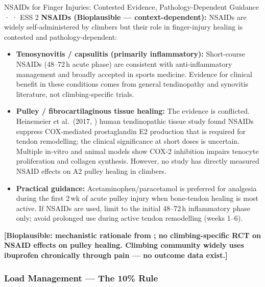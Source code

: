 \begin{bioplausbox}{NSAIDs for Finger Injuries: Contested Evidence, Pathology-Dependent Guidance · \bioplausible · ESS 2}
\textbf{NSAIDs (Bioplausible --- context-dependent):} NSAIDs are widely self-administered by climbers but their role in finger-injury healing is contested and pathology-dependent:
\begin{itemize}[leftmargin=1.5em,noitemsep]
  \item \textbf{Tenosynovitis / capsulitis (primarily inflammatory):} Short-course NSAIDs (48--72\,h acute phase) are consistent with anti-inflammatory management and broadly accepted in sports medicine. Evidence for clinical benefit in these conditions comes from general tendinopathy and synovitis literature, not climbing-specific trials.
  \item \textbf{Pulley / fibrocartilaginous tissue healing:} The evidence is conflicted. Heinemeier et al.\ (2017, \cite{HHM+17}) human tendinopathic tissue study found NSAIDs suppress COX-mediated prostaglandin E2 production that is required for tendon remodelling; the clinical significance at short doses is uncertain. Multiple in-vitro and animal models show COX-2 inhibition impairs tenocyte proliferation and collagen synthesis. However, no study has directly measured NSAID effects on A2 pulley healing in climbers.
  \item \textbf{Practical guidance:} Acetaminophen/paracetamol is preferred for analgesia during the first 2\,wk of acute pulley injury when bone-tendon healing is most active. If NSAIDs are used, limit to the initial 48--72\,h inflammatory phase only; avoid prolonged use during active tendon remodelling (weeks 1--6).
\end{itemize}
\textbf{[Bioplausible: mechanistic rationale from \cite{HHM+17}; no climbing-specific RCT on NSAID effects on pulley healing. Climbing community widely uses ibuprofen chronically through pain --- no outcome data exist.]}
\end{bioplausbox}

\subsubsection{Load Management --- The 10\% Rule}

